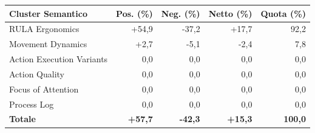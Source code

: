 \begin{tabular*}{\linewidth}{@{}l@{\extracolsep{\fill}}rrrr@{}}
\toprule
\textbf{Cluster Semantico} & \textbf{Pos. (\%)} & \textbf{Neg. (\%)} & \textbf{Netto (\%)} & \textbf{Quota (\%)} \\
\midrule
RULA Ergonomics & +54{,}9 & -37{,}2 & +17{,}7 & 92{,}2 \\
Movement Dynamics & +2{,}7 & -5{,}1 & -2{,}4 & 7{,}8 \\
Action Execution Variants & 0{,}0 & 0{,}0 & 0{,}0 & 0{,}0 \\
Action Quality & 0{,}0 & 0{,}0 & 0{,}0 & 0{,}0 \\
Focus of Attention & 0{,}0 & 0{,}0 & 0{,}0 & 0{,}0 \\
Process Log & 0{,}0 & 0{,}0 & 0{,}0 & 0{,}0 \\
\midrule
\textbf{Totale} & \textbf{+57{,}7} & \textbf{-42{,}3} & \textbf{+15{,}3} & \textbf{100{,}0} \\
\bottomrule
\end{tabular*}
